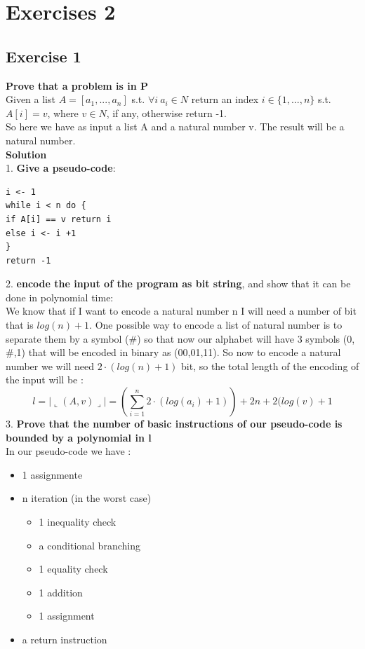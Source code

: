 \section{Exercises 2}

\subsection{Exercise 1}
\textbf{Prove that a problem is in P}\\
Given a list \(A = [a_1,...,a_n]\) s.t. \(\forall i \  a_i \in N \) return an index \(i \in \{1,...,n\}\) s.t. \(A[i] = v\), where \(v \in N\), if any, otherwise return -1. \\
So here we have as input a list A and a natural number v. The result will be a natural number. \\
\textbf{Solution}\\
1. \textbf{Give a pseudo-code}:
\begin{verbatim}
i <- 1 
while i < n do {
if A[i] == v return i
else i <- i +1
}
return -1

\end{verbatim}
2. \textbf{encode the input of the program as bit string}, and show that it can be done in polynomial time:\\
We know that if I want to encode a natural number n I will need a number of bit that is \(log(n)+1\). One possible way to encode a list of natural number is to separate them by a symbol ($\#$) so that now our alphabet will have 3 symbols (0, $\#$,1) that will be encoded in binary as (00,01,11). So now to encode a natural number we will need \(2 \cdot (log(n) +1)\) bit, so the total length of the encoding of the input will be :
\[l = |\llcorner (A,v)\lrcorner| = (\sum_{i=1}^n 2 \cdot (log(a_i) +1)) + 2n+ 2(log(v) +1\]
3. \textbf{Prove that the number of basic instructions of our pseudo-code is bounded by a polynomial in l}\\
In our pseudo-code we have :
\begin{itemize}
	\item 1 assignmente
	\item n iteration (in the worst case)
	      \begin{itemize}
		      \item 1 inequality check
		      \item a conditional branching
		      \item 1 equality check
		      \item 1 addition
		      \item 1 assignment
	      \end{itemize}
	\item a return instruction
\end{itemize}
